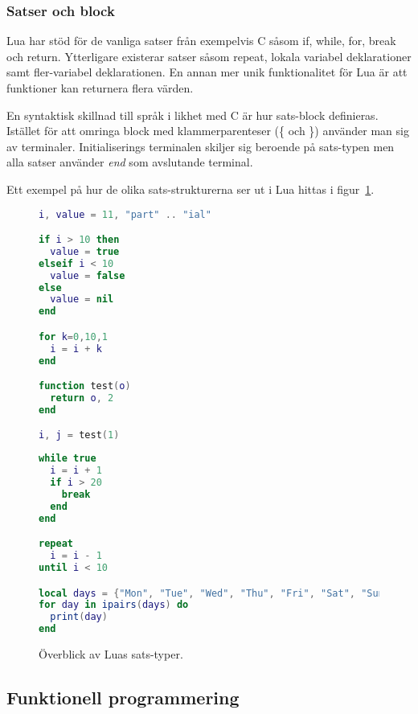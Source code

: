 \subsubsection{Satser och block}

Lua har stöd för de vanliga satser från exempelvis C såsom if, while, for,
break och return. Ytterligare existerar satser såsom repeat, lokala variabel
deklarationer samt fler-variabel deklarationen. En annan mer unik
funktionalitet för Lua är att funktioner kan returnera flera värden.

En syntaktisk skillnad till språk i likhet med C är hur sats-block definieras.
Istället för att omringa block med klammerparenteser (\{ och \}) använder man
sig av terminaler. Initialiserings terminalen skiljer sig beroende på
sats-typen men alla satser använder \textit{end} som avslutande terminal.

Ett exempel på hur de olika sats-strukturerna ser ut i Lua hittas i
figur~\ref{fig:luacode}.

\begin{figure}[ht]
  \begin{minipage}[t]{0.5\textwidth}
\begin{lstlisting}[language=Lua]
i, value = 11, "part" .. "ial"

if i > 10 then
  value = true
elseif i < 10
  value = false
else
  value = nil
end

for k=0,10,1
  i = i + k
end

function test(o)
  return o, 2
end

i, j = test(1)
\end{lstlisting}
  \end{minipage}
  \begin{minipage}[t]{0.5\textwidth}
\begin{lstlisting}[language=Lua]
while true
  i = i + 1
  if i > 20
    break
  end
end

repeat
  i = i - 1
until i < 10

local days = {"Mon", "Tue", "Wed", "Thu", "Fri", "Sat", "Sun"}
for day in ipairs(days) do
  print(day)
end
\end{lstlisting}
  \end{minipage}
  \caption{Överblick av Luas sats-typer.}
  \label{fig:luacode}
\end{figure}

\subsection{Funktionell programmering}

